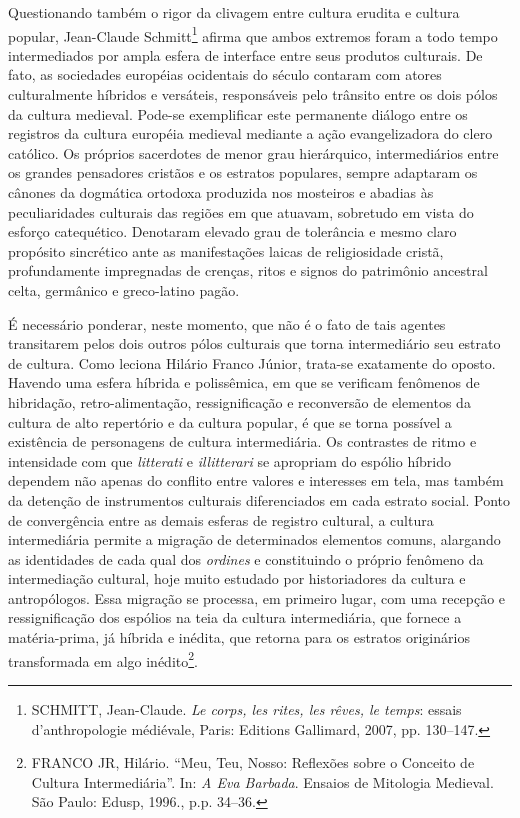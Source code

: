Questionando também o rigor da clivagem entre cultura erudita e cultura popular,
Jean-Claude Schmitt\footnote{ SCHMITT, Jean-Claude. \textit{Le corps, les
rites, les rêves, le temps}: essais d’anthropologie médiévale, Paris: Editions
Gallimard, 2007, pp. 130--147.} afirma que ambos extremos foram a todo tempo
intermediados por ampla esfera de interface entre seus produtos culturais. De
fato, as sociedades européias ocidentais do século  contaram com atores
culturalmente híbridos e versáteis, responsáveis pelo trânsito entre os dois
pólos da cultura medieval. Pode-se exemplificar este permanente diálogo entre
os registros da cultura européia medieval mediante a ação evangelizadora do
clero católico. Os próprios sacerdotes de menor grau hierárquico,
intermediários entre os grandes pensadores cristãos e os estratos populares,
sempre adaptaram os cânones da dogmática ortodoxa produzida nos mosteiros e
abadias às peculiaridades culturais das regiões em que atuavam, sobretudo em
vista do esforço catequético. Denotaram elevado grau de tolerância e mesmo
claro propósito sincrético ante as manifestações laicas de religiosidade
cristã, profundamente impregnadas de crenças, ritos e signos do patrimônio
ancestral celta, germânico e greco-latino pagão. 

É necessário ponderar, neste momento, que não é o fato de tais agentes
transitarem pelos dois outros pólos culturais que torna intermediário seu
estrato de cultura. Como leciona Hilário Franco Júnior, trata-se exatamente do
oposto. Havendo uma esfera híbrida e polissêmica, em que se verificam fenômenos
de hibridação, retro-alimentação, ressignificação e reconversão de elementos da
cultura de alto repertório e da cultura popular, é que se torna possível a
existência de personagens de cultura intermediária. Os contrastes de ritmo e
intensidade com que \textit{litterati} e \textit{illitterari} se apropriam do
espólio híbrido dependem não apenas do conflito entre valores e interesses em
tela, mas também da detenção de instrumentos culturais diferenciados em cada
estrato social. Ponto de convergência entre as demais esferas de registro
cultural, a cultura intermediária permite a migração de determinados elementos
comuns, alargando as identidades de cada qual dos \textit{ordines} e
constituindo o próprio fenômeno da intermediação cultural, hoje muito estudado
por historiadores da cultura e antropólogos. Essa migração se processa, em
primeiro lugar, com uma recepção e ressignificação dos espólios na teia da
cultura intermediária, que fornece a matéria-prima, já híbrida e inédita, que
retorna para os estratos originários transformada em algo inédito\footnote{
FRANCO JR, Hilário. “Meu, Teu, Nosso: Reflexões sobre o Conceito de Cultura
Intermediária”. In: \textit{A Eva Barbada}. Ensaios de Mitologia Medieval. São
Paulo: Edusp, 1996., p.p. 34--36. }.

